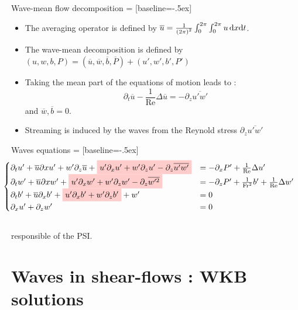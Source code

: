 \documentclass[10pt]{beamer}
\newcommand{\NodeFill}[3]{\tikz[baseline]{\node[fill=#1!20,anchor=base](#2){#3};}}
\begin{document}
\begin{frame}[fragile]{Wave\--mean flow decomposition}
   = [baseline=-.5ex]
  \begin{itemize}
    \item The averaging operator is defined by $\overline{u}=\frac{1}{\left(2\pi\right)^{2}}\intop_{0}^{2\pi}\intop_{0}^{2\pi}u\,\mathrm{d}x\mathrm{d}t$.
    \item The wave\--mean decomposition is defined by $\left(u,w,b,P\right)=\left(\overline{u},\overline{w},\overline{b},\overline{P}\right)+\left(u',w',b',P'\right)$
    \item Taking the mean part of the equations of motion leads to :\begin{equation*}\partial_{t}\overline{u}-\frac{1}{\mathrm{Re}}\Delta\overline{u} =- \partial_{z}\overline{u'w'}\end{equation*} and $\overline{w},\overline{b}=0$.
    \item Streaming is induced by the waves from the Reynold stress $\partial_{z}\overline{u'w'}$
  \end{itemize}
\end{frame}

\begin{frame}[fragile]{Waves equations}
   = [baseline=-.5ex]
  \begin{equation*}
    \!\!\!\!\!\!\!\!\!\!\!\!\!\!
    \begin{cases}
      \partial_{t}u'+\overline{u}\partial{x}u'+w'\partial_{z}\overline{u}+\NodeFill{red}{}{$u'\partial_{x}u'+w'\partial_{z}u'-\partial_{z}\overline{u'w'} $}& = -\partial_{x}P'+\frac{1}{\mathrm{Re}}\Delta u'\\
      \partial_{t}w'+\overline{u}\partial{x}w'+\NodeFill{red}{}{$u'\partial_{x}w'+w'\partial_{z}w'-\partial_{z}\overline{w'^{2}}$}&=-\partial_{z}P'+\frac{1}{\mathrm{Fr}^{2}}b'+\frac{1}{\mathrm{Re}}\Delta w'\\
      \partial_{t}b'+\overline{u}\partial_{x}b'+\NodeFill{red}{}{$u'\partial_{x}b'+w'\partial_{z}b'$}+w'&=0\\
      \partial_{x}u'+\partial_{z}w'&=0
    \end{cases}
  \end{equation*}\\
  \NodeFill{red}{}{Non\--linear terms} responsible of the PSI.
\end{frame}

\section{Waves in shear\--flows : WKB solutions}
\end{document}
